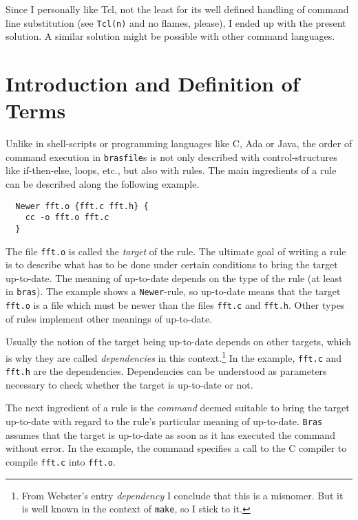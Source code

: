 \documentclass[12pt]{article}
\newcommand{\bras}{\texttt{bras}}
\newcommand{\Bras}{\texttt{Bras}}
\newcommand{\make}{\texttt{make}}
\newcommand{\brasfile}{\texttt{brasfile}}
\begin{document}
Since I personally like Tcl, not the least for its well defined
handling of command line substitution (see \texttt{Tcl(n)} and no
flames, please), I ended up with the present solution. A similar
solution might be possible with other command languages.


\section{Introduction and Definition of Terms}
\label{SecDefTerms}

Unlike in shell-scripts or programming languages like C, Ada or Java,
the order of command execution in \brasfile{}s is not only described with
control-structures like if-then-else, loops, etc., but also with rules.
The main ingredients of a rule can be described along the following
example.

\begin{verbatim}
  Newer fft.o {fft.c fft.h} {
    cc -o fft.o fft.c
  }
\end{verbatim}

The file \texttt{fft.o} is called the \textit{target} of the rule. The
ultimate goal of writing a rule is to describe what has to be done
under certain conditions to bring the target up-to-date. The meaning
of up-to-date depends on the type of the rule (at least in
\bras{}). The example shows a \texttt{Newer}-rule, so
up-to-date means that the target \texttt{fft.o} is a file which must
be newer than the files \texttt{fft.c} and \texttt{fft.h}. Other
types of rules implement other meanings of up-to-date.

Usually the notion of the target being up-to-date depends on other
targets, which is why they are called \textit{dependencies} in this
context.\footnote{From Webster's entry \textit{dependency} I conclude
  that this is a misnomer. But it is well known in the context of
  \make{}, so I stick to it.} In the example, \texttt{fft.c} and
\texttt{fft.h} are the dependencies.  Dependencies can be understood
as parameters necessary to check whether the target is up-to-date or
not.

The next ingredient of a rule is the \textit{command} deemed suitable
to bring the target up-to-date with regard to the rule's particular
meaning of up-to-date. \Bras{} assumes that the target
is up-to-date as soon as it has executed the command without error. In
the example, the command specifies a call to the C compiler to compile
\texttt{fft.c} into \texttt{fft.o}.
\end{document}
